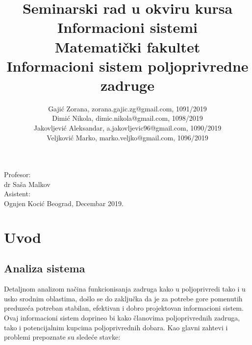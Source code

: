 \documentclass[a4paper, oneside]{article}
\begin{document}

\title{\normalsize{Seminarski rad u okviru kursa\\Informacioni sistemi\\ Matematički fakultet\\}\vspace{1cm} \huge Informacioni sistem poljoprivredne zadruge\\ }

\vspace{1cm}

\author{\large Gajić Zorana, zorana.gajic.zg@gmail.com, 
        1091/2019 \\ 
        \large Dimić Nikola, dimic.nikola@gmail.com, 
        1098/2019 \\
        \large Jakovljević Aleksandar, a.jakovljevic96@gmail.com, 
        1090/2019 \\ 
        \large Veljković Marko, marko.veljko@gmail.com, 
        1096/2019 \\}

\date{}

\maketitle

\vspace{\fill}

\large{
Profesor: \\ dr Saša Malkov \\

Asistent: \\ Ognjen Kocić \hfill Beograd, Decembar 2019.
}

\newpage

\tableofcontents

\newpage


\section{Uvod}
\subsection{Analiza sistema}

Detaljnom analizom načina funkcionisanja zadruga kako u poljoprivredi tako i u usko srodnim oblastima, došlo se do zaključka da je za potrebe gore pomenutih preduzeća potreban stabilan, efektivan i dobro projektovan informacioni sistem. Ovaj informacioni sistem doprineo bi kako članovima poljoprivrednih zadruga, tako i potencijalnim kupcima poljoprivrednih dobara. Kao glavni zahtevi i problemi prepoznate su sledeće stavke:
\end{document}

